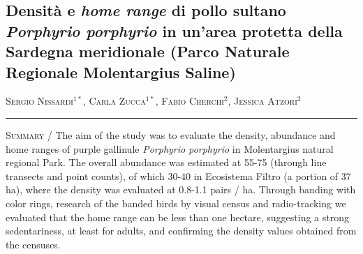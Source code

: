\setcounter{figure}{0}
\setcounter{table}{0}

\begin{adjustwidth}{-3.5cm}{0cm}
\pagestyle{CIOpage}
\chapter*[Density and home range of purple gallinule]{
Densit\`a e \textit{home range} di pollo sultano \textit{Porphyrio porphyrio} in un{\textquoteright}area protetta della Sardegna meridionale (Parco Naturale Regionale Molentargius Saline)}

\textsc{Sergio Nissardi}$^{1*}$, \textsc{Carla Zucca}$^{1*}$,
\textsc{Fabio Cherchi}$^{2}$, \textsc{Jessica Atzori}$^{2}$  \\

   
\noindent\color{MUSEBLUE}\rule{27cm}{2pt}
\vspace{1cm}
\end{adjustwidth}


{\small
\noindent \textsc{\color{MUSEBLUE} Summary} / The aim of the study was to evaluate the density, abundance and home
ranges of purple gallinule \textit{Porphyrio porphyrio} in Molentargius
natural regional Park.
The overall abundance was estimated at 55-75 (through line transects and
point counts), of which 30-40 in Ecosistema Filtro (a portion of 37
ha), where the density was evaluated at 0.8-1.1 pairs / ha.
Through banding with color rings, research of the banded birds by visual
census and radio-tracking we evaluated that the home range can be less
than one hectare, suggesting a strong sedentariness, at least for
adults, and confirming the density values obtained from the censuses.\\
}
\vspace{1cm}

